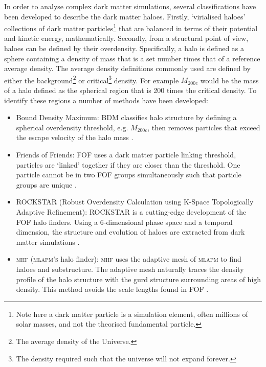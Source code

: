 In order to analyse complex dark matter simulations, several classifications have been developed to describe the dark matter haloes. Firstly, `virialised haloes' collections of dark matter particles\footnote{Note here a dark matter particle is a simulation element, often millions of solar masses, and not the theorised fundamental particle.} that are balanced in terms of their potential and kinetic energy, mathematically.
Secondly, from a structural point of view, haloes can be defined by their overdensity. 
Specifically, a halo is defined as a sphere containing a density of mass that is a set number times that of a reference average density. The average density definitions commonly used are defined by either the background\footnote{The average density of the Universe.} or critical\footnote{The density required such that the universe will not expand forever.} density.
For example $M_{200c}$ would be the mass of a halo defined as the spherical region that is 200 times the critical density. To identify these regions a number of methods have been developed:

\begin{itemize}
    \item Bound Density Maximum: BDM classifies halo structure by defining a spherical overdensity threshold, e.g. $M_{200c}$, then removes particles that exceed the escape velocity of the halo mass \citep{Klypin1997Particle-MeshSimulations}.
    \item Friends of Friends: FOF uses a dark matter particle linking threshold, particles are `linked' together if they are closer than the threshold. One particle cannot be in two FOF groups simultaneously such that particle groups are unique \citep{Davis1985THEMATTER}.
    \item ROCKSTAR (Robust Overdensity Calculation using K-Space Topologically Adaptive Refinement): ROCKSTAR is a cutting-edge development of the FOF halo finders. Using a 6-dimensional phase space and a temporal dimension, the structure and evolution of haloes are extracted from dark matter simulations \citep{Behroozi2011TheCores}.
    \item \textsc{mhf} (\textsc{mlapm's} halo finder): \textsc{mhf} uses the adaptive mesh of \textsc{mlapm} to find haloes and substructure. The adaptive mesh naturally traces the density profile of the halo structure with the gurd structure surrounding areas of high density. This method avoids the scale lengths found in FOF \citep{Gill2004TheMethod}.
\end{itemize}

